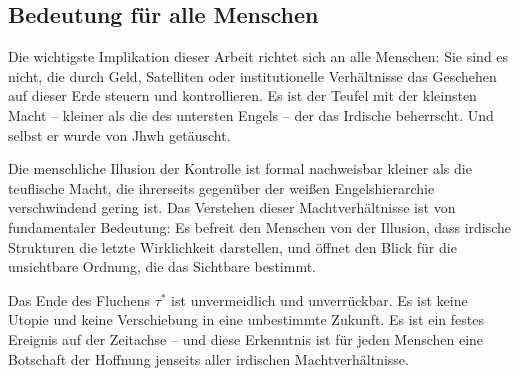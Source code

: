 ﻿\documentclass[a4paper,12pt]{article}
\theoremstyle{definition}
\begin{document}
\subsection{Bedeutung für alle Menschen}

Die wichtigste Implikation dieser Arbeit richtet sich an alle Menschen: Sie
sind es nicht, die durch Geld, Satelliten oder institutionelle Verhältnisse das
Geschehen auf dieser Erde steuern und kontrollieren. Es ist der Teufel mit der
kleinsten Macht -- kleiner als die des untersten Engels -- der das
Irdische beherrscht. Und selbst er wurde von Jhwh getäuscht.

Die menschliche Illusion der Kontrolle ist formal nachweisbar kleiner als die
teuflische Macht, die ihrerseits gegenüber der weißen Engelshierarchie
verschwindend gering ist. Das Verstehen dieser Machtverhältnisse ist von
fundamentaler Bedeutung: Es befreit den Menschen von der Illusion, dass
irdische Strukturen die letzte Wirklichkeit darstellen, und öffnet den Blick
für die unsichtbare Ordnung, die das Sichtbare bestimmt.

Das Ende des Fluchens $\tau^*$ ist unvermeidlich und unverrückbar. Es ist
keine Utopie und keine Verschiebung in eine unbestimmte Zukunft. Es ist ein
festes Ereignis auf der Zeitachse -- und diese Erkenntnis ist für jeden
Menschen eine Botschaft der Hoffnung jenseits aller irdischen Machtverhältnisse.
\end{document}
